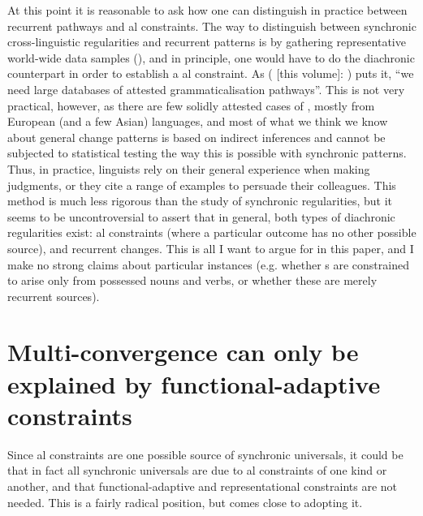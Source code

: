 \documentclass[output=paper]{langsci/langscibook}
\begin{document}
At this point it is reasonable to ask how one can distinguish in practice between recurrent pathways and al constraints. The way to distinguish between synchronic cross-linguistic regularities and recurrent patterns is by gathering representative world-wide data samples (), and in principle, one would have to do the diachronic counterpart in order to establish a al constraint. As \citeauthor{Collins2019tv} (\citeyear{Collins2019tv} [this volume]: \pageref{pg:collins:refforhaspelmath}) puts it, “we need large databases of attested grammaticalisation pathways”. This is not very practical, however, as there are few solidly attested cases of , mostly from European (and a few Asian) languages, and most of what we think we know about general change patterns is based on indirect inferences and cannot be subjected to statistical testing the way this is possible with synchronic patterns. Thus, in practice, linguists rely on their general experience when making judgments, or they cite a range of examples to persuade their colleagues. This method is much less rigorous than the study of synchronic regularities, but it seems to be uncontroversial to assert that in general, both types of diachronic regularities exist: al constraints (where a particular outcome has no other possible source), and recurrent changes. This is all I want to argue for in this paper, and I make no strong claims about particular instances (e.g. whether s are constrained to arise only from possessed nouns and  verbs, or whether these are merely recurrent sources).
 

\section{Multi-convergence can only be explained by functional-adaptive constraints}\label{sec:haspelmath:5}

Since al constraints are one possible source of synchronic universals, it could be that in fact all synchronic universals are due to al constraints of one kind or another, and that functional-adaptive and representational constraints are not needed. This is a fairly radical position, but \citet{Cristofaro2017} comes close to adopting it.
\end{document}
